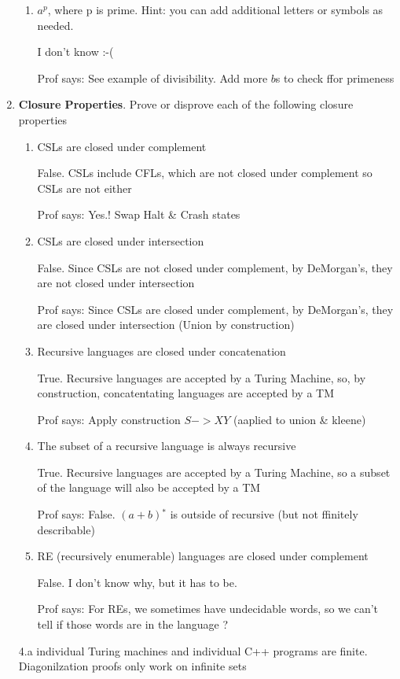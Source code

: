 \documentclass[12pt]{scrbook}
\newcommand{\kleene}{{}^\ast}
\begin{document}
\begin{enumerate}
\begin{enumerate}
        \item $a^p$, where p is prime. Hint: you can add additional letters or symbols as needed.

          I don't know :-(

          Prof says: See example of divisibility.  Add more $b$s to check ffor primeness

      \end{enumerate}

  \item \textbf{Closure Properties}.  Prove or disprove each of the following closure properties
    \begin{enumerate}
          \item CSLs are closed under complement

            False.  CSLs include CFLs, which are not closed under complement
            so CSLs are not either

            Prof says: Yes.!  Swap Halt & Crash states

          \item CSLs are closed under intersection

            False.  Since CSLs are not closed under complement, by
            DeMorgan's, they are not closed under intersection

            Prof says: Since CSLs are closed under complement, by
            DeMorgan's, they are closed under intersection (Union by construction)

          \item Recursive languages are closed under concatenation

            True.  Recursive languages are accepted by a Turing Machine,
            so, by construction, concatentating languages are accepted
            by a TM

            Prof says: Apply construction $S -> XY$ (aaplied to union & kleene)

          \item The subset of a recursive language is always recursive

            True.  Recursive languages are accepted by a Turing Machine,
            so a subset of the language will also be accepted
            by a TM

            Prof says: False.  $(a + b)\kleene$ is outside of recursive
            (but not ffinitely describable)

          \item RE (recursively enumerable) languages are closed under complement

            False.  I don't know why, but it has to be.

            Prof says: For REs, we sometimes have undecidable words,
            so we can't tell if those words are in the language ?


    \end{enumerate}

    4.a individual Turing machines and individual C++ programs are finite.
    Diagonilzation proofs only work on infinite sets

    

\end{enumerate}
\end{document}
